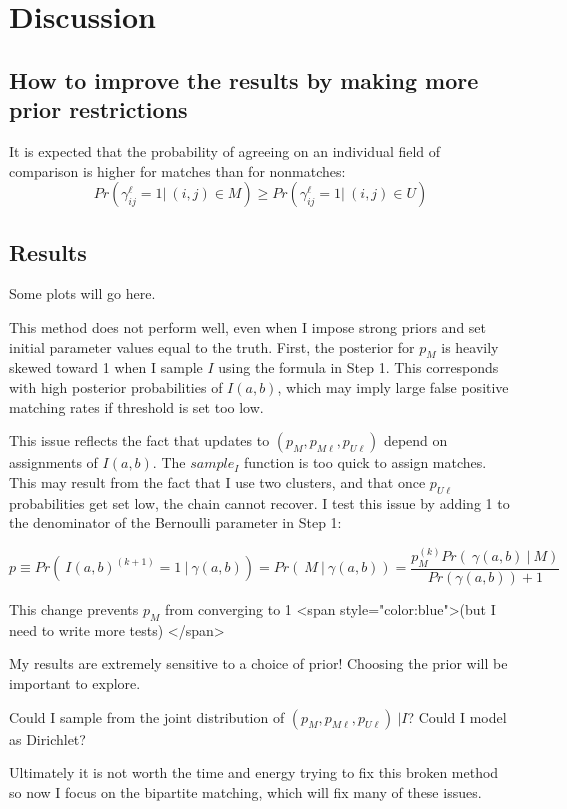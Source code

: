 \documentclass[11pt,reqno]{amsart}
\begin{document}
\section{Discussion}
\subsection{How to improve the results by making more prior restrictions}

It is expected that the probability of agreeing on an individual field of comparison is higher for matches than for nonmatches:
$$Pr\left(\gamma_{ij}^{\ell} = 1 |\ (i,j)\in M\right) \geq Pr\left(\gamma_{ij}^{\ell} = 1 |\ (i,j) \in U\right) $$ 
\subsection{Results} Some plots will go here. 



This method does not perform well, even when I impose strong priors and set initial parameter values equal to the truth.   First, the posterior for $p_M$ is heavily skewed toward 1 when I sample $I$ using the formula in Step 1.  This corresponds with high posterior probabilities of $I(a,b)$, which may imply large false positive matching rates if threshold is set too low. 

This issue reflects the fact that updates to $(p_M, p_{M\ell}, p_{U\ell})$ depend on assignments of $I(a,b)$. The $sample_I$ function is too quick to assign matches.  This may result from the fact that I use two clusters, and that once $p_{U\ell}$ probabilities get set low, the chain cannot recover.  I test this issue by adding 1 to the denominator of the Bernoulli parameter in Step 1:

$$p \equiv Pr(\ I(a,b)^{(k+1)}=1\ |\ \gamma(a,b)) = Pr(\ M\  |\  \gamma(a,b)) = \frac{p_M^{(k)}Pr(\ \gamma(a,b)\ |\ M)}{Pr(\gamma(a,b)) + 1} $$ 

This change prevents $p_M$ from converging to 1 <span style="color:blue">(but I need to write more tests) </span>

My results are extremely sensitive to a choice of prior! Choosing the prior will be important to explore. 

Could I sample from the joint distribution of $(p_M, p_{M\ell}, p_{U\ell})\ | I$?  Could I model as Dirichlet?

Ultimately it is not worth the time and energy trying to fix this broken method so now I focus on the bipartite matching, which will fix many of these issues.
\end{document}
